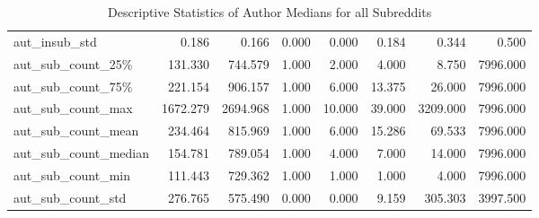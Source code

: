 \begin{table}
\begin{tabular}{lrrrrrrr}
aut\_insub\_std          &     0.186 &      0.166 & 0.000 &  0.000 &   0.184 &     0.344 &       0.500 \\
aut\_sub\_count\_25\%      &   131.330 &    744.579 & 1.000 &  2.000 &   4.000 &     8.750 &    7996.000 \\
aut\_sub\_count\_75\%      &   221.154 &    906.157 & 1.000 &  6.000 &  13.375 &    26.000 &    7996.000 \\
aut\_sub\_count\_max      &  1672.279 &   2694.968 & 1.000 & 10.000 &  39.000 &  3209.000 &    7996.000 \\
aut\_sub\_count\_mean     &   234.464 &    815.969 & 1.000 &  6.000 &  15.286 &    69.533 &    7996.000 \\
aut\_sub\_count\_median   &   154.781 &    789.054 & 1.000 &  4.000 &   7.000 &    14.000 &    7996.000 \\
aut\_sub\_count\_min      &   111.443 &    729.362 & 1.000 &  1.000 &   1.000 &     4.000 &    7996.000 \\
aut\_sub\_count\_std      &   276.765 &    575.490 & 0.000 &  0.000 &   9.159 &   305.303 &    3997.500 \\
\bottomrule
\end{tabular}
\caption{Descriptive Statistics of Author Medians for all Subreddits}
\label{table/author-medians:all}
\end{table}